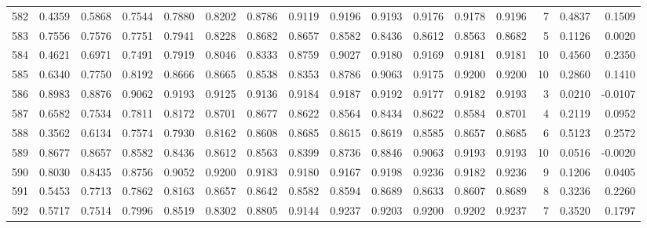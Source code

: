 \begin{tabular}{lrrrrrrrrrrrrrrr}
582 &      0.4359 &  0.5868 &  0.7544 &  0.7880 &  0.8202 &  0.8786 &  0.9119 &  0.9196 &  0.9193 &  0.9176 &   0.9178 &     0.9196 &      7 &                    0.4837 &                     0.1509 \\
583 &      0.7556 &  0.7576 &  0.7751 &  0.7941 &  0.8228 &  0.8682 &  0.8657 &  0.8582 &  0.8436 &  0.8612 &   0.8563 &     0.8682 &      5 &                    0.1126 &                     0.0020 \\
584 &      0.4621 &  0.6971 &  0.7491 &  0.7919 &  0.8046 &  0.8333 &  0.8759 &  0.9027 &  0.9180 &  0.9169 &   0.9181 &     0.9181 &     10 &                    0.4560 &                     0.2350 \\
585 &      0.6340 &  0.7750 &  0.8192 &  0.8666 &  0.8665 &  0.8538 &  0.8353 &  0.8786 &  0.9063 &  0.9175 &   0.9200 &     0.9200 &     10 &                    0.2860 &                     0.1410 \\
586 &      0.8983 &  0.8876 &  0.9062 &  0.9193 &  0.9125 &  0.9136 &  0.9184 &  0.9187 &  0.9192 &  0.9177 &   0.9182 &     0.9193 &      3 &                    0.0210 &                    -0.0107 \\
587 &      0.6582 &  0.7534 &  0.7811 &  0.8172 &  0.8701 &  0.8677 &  0.8622 &  0.8564 &  0.8434 &  0.8622 &   0.8584 &     0.8701 &      4 &                    0.2119 &                     0.0952 \\
588 &      0.3562 &  0.6134 &  0.7574 &  0.7930 &  0.8162 &  0.8608 &  0.8685 &  0.8615 &  0.8619 &  0.8585 &   0.8657 &     0.8685 &      6 &                    0.5123 &                     0.2572 \\
589 &      0.8677 &  0.8657 &  0.8582 &  0.8436 &  0.8612 &  0.8563 &  0.8399 &  0.8736 &  0.8846 &  0.9063 &   0.9193 &     0.9193 &     10 &                    0.0516 &                    -0.0020 \\
590 &      0.8030 &  0.8435 &  0.8756 &  0.9052 &  0.9200 &  0.9183 &  0.9180 &  0.9167 &  0.9198 &  0.9236 &   0.9182 &     0.9236 &      9 &                    0.1206 &                     0.0405 \\
591 &      0.5453 &  0.7713 &  0.7862 &  0.8163 &  0.8657 &  0.8642 &  0.8582 &  0.8594 &  0.8689 &  0.8633 &   0.8607 &     0.8689 &      8 &                    0.3236 &                     0.2260 \\
592 &      0.5717 &  0.7514 &  0.7996 &  0.8519 &  0.8302 &  0.8805 &  0.9144 &  0.9237 &  0.9203 &  0.9200 &   0.9202 &     0.9237 &      7 &                    0.3520 &                     0.1797 \\

\end{tabular}

